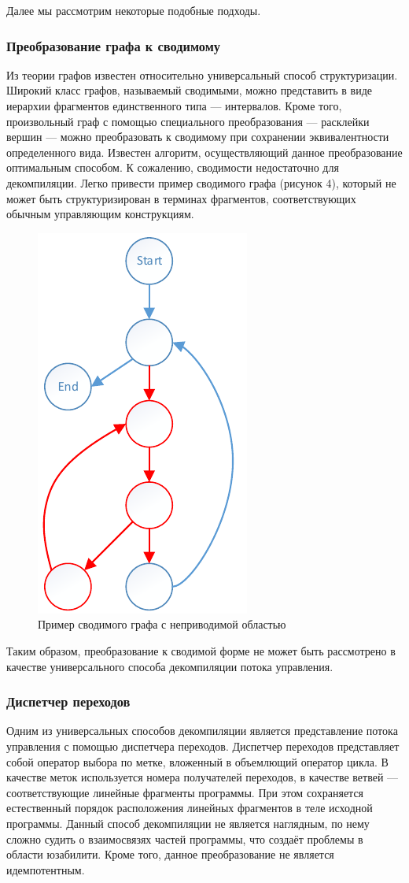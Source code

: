 Далее мы рассмотрим некоторые подобные подходы.

\subsubsection*{Преобразование графа к сводимому}
Из теории графов известен относительно универсальный способ структуризации. Широкий класс графов, называемый сводимыми, можно представить в виде иерархии фрагментов единственного типа --- интервалов. Кроме того, произвольный граф с помощью специального преобразования --- расклейки вершин --- можно преобразовать к сводимому при сохранении эквивалентности определенного вида\cite{hecht}. Известен алгоритм, осуществляющий данное преобразование оптимальным способом\cite{kasyanov}. К сожалению, сводимости недостаточно для декомпиляции. Легко привести пример сводимого графа (рисунок 4), который не может быть структуризирован в терминах фрагментов, соответствующих обычным управляющим конструкциям.  

\begin{figure}[H]
\centering \includegraphics[width=0.3\linewidth]{Zabransky/graph.pdf}
\caption{Пример сводимого графа с неприводимой областью}
\end{figure}

Таким образом, преобразование к сводимой форме не может быть рассмотрено в качестве универсального способа декомпиляции потока управления.

\subsubsection*{Диспетчер переходов}
Одним из универсальных способов декомпиляции является представление потока управления с помощью диспетчера переходов\cite{pliss}. Диспетчер переходов представляет собой оператор выбора по метке, вложенный в объемлющий оператор цикла. В качестве меток используется номера получателей переходов, в качестве ветвей --- соответствующие линейные фрагменты программы. При этом сохраняется естественный порядок расположения линейных фрагментов в теле исходной программы. Данный способ декомпиляции не является наглядным, по нему сложно судить о взаимосвязях частей программы, что создаёт проблемы в области юзабилити. Кроме того, данное преобразование не является идемпотентным.

